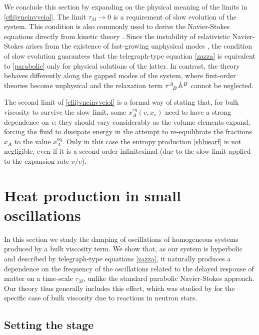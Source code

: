 \documentclass[useAMS,usenatbib,prd,twocolumn,nofootinbib]{revtex4-1}
\begin{document}
We conclude this section by expanding on the physical
meaning of the limits in \eqref{efiijvneinvveiol}. The limit $\tau_M \longrightarrow 0$ is a requirement of slow evolution of the system. This condition is also commonly used to derive the Navier-Stokes equations directly from kinetic theory \citep{huang_book}. Since the instability of relativistic Navier-Stokes arises from the existence of fast-growing unphysical modes \citep{Hiscock_Insatibility_first_order,Kost2000,GavassinoLyapunov2020}, the condition of slow evolution guarantees that the telegraph-type equation \eqref{zazza} is equivalent to \eqref{parabolic} only for physical solutions of the latter. In contrast, the theory behaves differently along the gapped modes of the system, where first-order theories become unphysical \citep{Kovtun2019} and the relaxation term $\tau\indices{^A _B} \dot{\mathbb{A}}^B$ cannot be neglected.

The second limit of \eqref{efiijvneinvveiol} is a formal way of stating that, for bulk viscosity to survive the slow limit, some $x_A^{eq}(v,x_s)$ need to have a strong dependence on $v$: they should vary considerably as the volume elements expand, forcing the fluid to dissipate energy in the attempt to re-equilibrate the fractions $x_A$ to the value $x_A^{\text{eq}}$. Only in this case the entropy production \eqref{sbluearf} is not negligible, even if it is a second-order infinitesimal (due to the slow limit applied to the expansion rate $\dot{v}/v$).




\section{Heat production in small oscillations}

In this section we study the damping of oscillations of homogeneous systems produced by a bulk viscosity term.
We show that, as our system is hyperbolic and described by telegraph-type equations \eqref{zazza}, it naturally produces a dependence on the frequency of the oscillations related to the delayed response of matter on a time-scale $\tau_M$, unlike the standard parabolic Navier-Stokes approach. Our theory thus generally includes this effect, which was studied by \citet{Sawyer_Bulk1989} for the specific case of bulk viscosity due to reactions in neutron stars.


\subsection{Setting the stage} 
\end{document}
